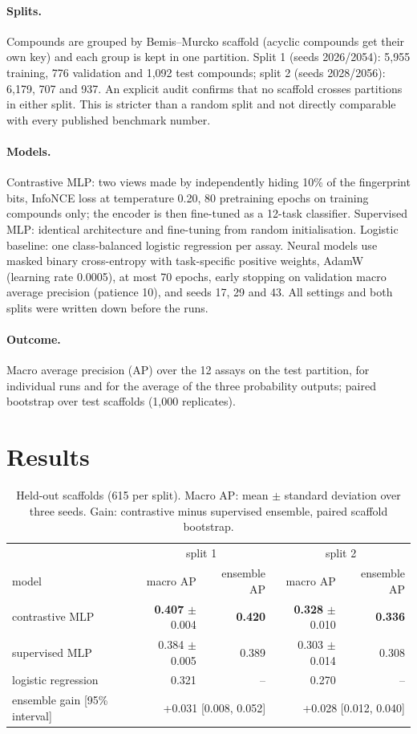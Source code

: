 \documentclass[11pt]{article}
\begin{document}
\paragraph{Splits.} Compounds are grouped by Bemis--Murcko scaffold (acyclic compounds get their own key) and each
group is kept in one partition. Split 1 (seeds 2026/2054): 5,955 training, 776 validation and 1,092 test compounds;
split 2 (seeds 2028/2056): 6,179, 707 and 937. An explicit audit confirms that no scaffold crosses partitions in
either split. This is stricter than a random split and not directly comparable with every published benchmark
number.
\paragraph{Models.} Contrastive MLP: two views made by independently hiding 10\% of the fingerprint bits, InfoNCE
loss at temperature 0.20, 80 pretraining epochs on training compounds only; the encoder is then fine-tuned as a
12-task classifier. Supervised MLP: identical architecture and fine-tuning from random initialisation. Logistic
baseline: one class-balanced logistic regression per assay. Neural models use masked binary cross-entropy with
task-specific positive weights, AdamW (learning rate 0.0005), at most 70 epochs, early stopping on validation macro
average precision (patience 10), and seeds 17, 29 and 43. All settings and both splits were written down before the
runs.
\paragraph{Outcome.} Macro average precision (AP) over the 12 assays on the test partition, for individual runs and
for the average of the three probability outputs; paired bootstrap over test scaffolds (1,000 replicates).

\section{Results}
\begin{table}[h]
\centering
\begin{tabular}{lrrrr}
\toprule
 & \multicolumn{2}{c}{split 1} & \multicolumn{2}{c}{split 2} \\
model & macro AP & ensemble AP & macro AP & ensemble AP \\
\midrule
contrastive MLP & \textbf{0.407} $\pm$ 0.004 & \textbf{0.420} & \textbf{0.328} $\pm$ 0.010 & \textbf{0.336} \\
supervised MLP & 0.384 $\pm$ 0.005 & 0.389 & 0.303 $\pm$ 0.014 & 0.308 \\
logistic regression & 0.321 & -- & 0.270 & -- \\
\midrule
ensemble gain [95\% interval] & \multicolumn{2}{r}{+0.031 [0.008, 0.052]} & \multicolumn{2}{r}{+0.028 [0.012, 0.040]} \\
\bottomrule
\end{tabular}
\caption{Held-out scaffolds (615 per split). Macro AP: mean $\pm$ standard deviation over three seeds. Gain:
contrastive minus supervised ensemble, paired scaffold bootstrap.}
\label{tab:results}
\end{table}
\end{document}
